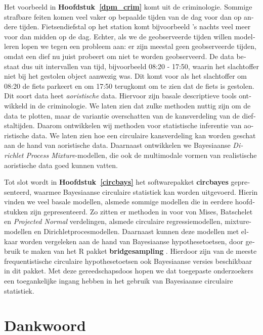 \documentclass[12pt, a4paper]{book}\usepackage[]{graphicx}\usepackage{xcolor}
\let\proglang=\textsf
\newcommand{\pkg}[1]{\textbf{#1}}
\begin{document}
\begin{otherlanguage}{dutch}
Het voorbeeld in \textbf{Hoofdstuk~\ref{dpm_crim}} komt uit de criminologie. Sommige strafbare feiten komen veel vaker op bepaalde tijden van de dag voor dan op andere tijden. Fietsendiefstal op het station komt bijvoorbeeld 's nachts veel meer voor dan midden op de dag. Echter, als we de geobserveerde tijden willen modelleren lopen we tegen een probleem aan: er zijn meestal geen geobserveerde tijden, omdat een dief nu juist probeert om niet te worden geobserveerd. De data bestaat dus uit intervallen van tijd, bijvoorbeeld 08:20 - 17:50, waarin het slachtoffer niet bij het gestolen object aanwezig was. Dit komt voor als het slachtoffer om 08:20 de fiets parkeert en om 17:50 terugkomt om te zien dat de fiets is gestolen. Dit soort data heet \textit{aoristische} data. Hiervoor zijn basale descriptieve tools ontwikkeld \citep{ashby2013comparison} in de criminologie. We laten zien dat zulke methoden nuttig zijn om de data te plotten, maar de variantie overschatten van de kansverdeling van de diefstaltijden. Daarom ontwikkelen wij methoden voor statistische inferentie van aoristische data. We laten zien hoe een circulaire kansverdeling kan worden geschat aan de hand van aoristische data. Daarnaast ontwikkelen we Bayesiaanse \textit{Dirichlet Process Mixture}-modellen, die ook de multimodale vormen van realistische aoristische data goed kunnen vatten.

Tot slot wordt in \textbf{Hoofdstuk~\ref{circbays}} het softwarepakket \pkg{circbayes} gepresenteerd, waarmee Bayesiaanse circulaire statistiek kan worden uitgevoerd. Hierin vinden we veel basale modellen, alsmede sommige modellen die in eerdere hoofdstukken zijn gepresenteerd. Zo zitten er methoden in voor von Mises, Batschelet en \textit{Projected Normal} verdelingen, alsmede circulaire regressiemodellen, mixture-modellen en Dirichletprocesmodellen. Daarnaast kunnen deze modellen met elkaar worden vergeleken aan de hand van Bayesiaanse hypothesetoetsen, door gebruik te maken van het \proglang{R} pakket \pkg{bridgesampling} \citep{gronau2017bridgesampling}. Hierdoor zijn van de meeste frequentistische circulaire hypothesetoetsen ook Bayesiaanse versies beschikbaar in dit pakket. Met deze gereedschapsdoos hopen we dat toegepaste onderzoekers een toegankelijke ingang hebben in het gebruik van Bayesiaanse circulaire statistiek.

\end{otherlanguage}


\chapter{Dankwoord}
\end{document}
